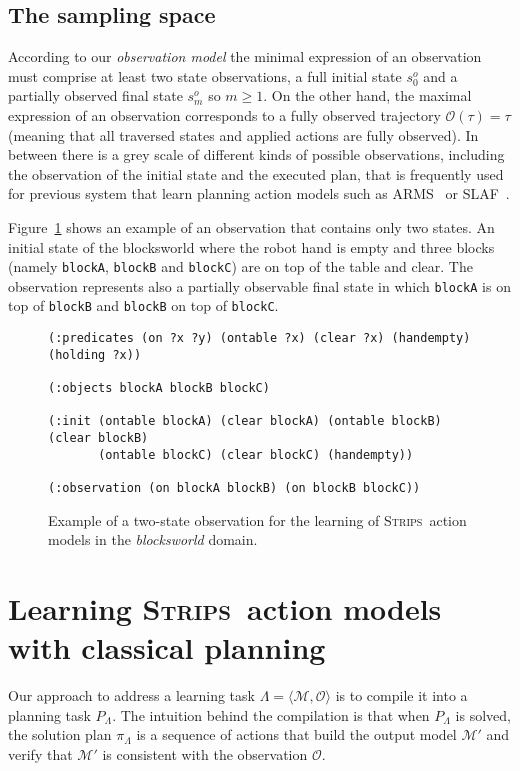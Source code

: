 \documentclass[runningheads]{llncs}
\newcommand{\tup}[1]{{\langle #1 \rangle}}
\newcommand{\strips}{\textsc{Strips}}     %
\begin{document}
\subsection{The sampling space}
According to our {\em observation model} the minimal expression of an observation must comprise at least two state observations, a full initial state $s_0^o$ and a partially observed final state $s_m^o$ so $m \geq 1$. On the other hand, the maximal expression of an observation corresponds to a fully observed trajectory $\mathcal{O}(\tau)=\tau$ (meaning that all traversed states and applied actions are fully observed). In between there is a grey scale of different kinds of possible observations, including the observation of the initial state and the executed plan, that is frequently used for previous system that learn planning action models such as {\sc ARMS}~\cite{yang2007learning} or {\sc SLAF}~\cite{amir:alearning:JAIR08}.

Figure~\ref{fig:observation} shows an example of an observation that contains only two states. An initial state of the blocksworld where the robot hand is empty and three blocks (namely {\small\tt blockA}, {\small\tt blockB} and {\small\tt blockC}) are on top of the table and clear. The observation represents also a partially observable final state in which {\tt\small{blockA}} is on top of {\tt\small{blockB}} and {\tt\small{blockB}} on top of {\tt\small{blockC}}.

\begin{figure}[hbt!]
  \begin{small}
  \begin{verbatim}
(:predicates (on ?x ?y) (ontable ?x) (clear ?x) (handempty) (holding ?x))

(:objects blockA blockB blockC)

(:init (ontable blockA) (clear blockA) (ontable blockB) (clear blockB)
       (ontable blockC) (clear blockC) (handempty))

(:observation (on blockA blockB) (on blockB blockC))
  \end{verbatim}
  \end{small}
	\caption{\small Example of a two-state observation for the learning of \strips\ action models in the {\em blocksworld} domain.}
	\label{fig:observation}
\end{figure}



\section{Learning \strips\ action models with classical planning}
Our approach to address a learning task $\Lambda=\tup{\mathcal{M},{\mathcal O}}$ is to compile it into a planning task $P_{\Lambda}$. The intuition behind the compilation is that when $P_{\Lambda}$ is solved, the solution plan $\pi_\Lambda$ is a sequence of actions that build the output model $\mathcal{M'}$ and verify that $\mathcal{M'}$ is consistent with the observation ${\mathcal O}$.
\end{document}
